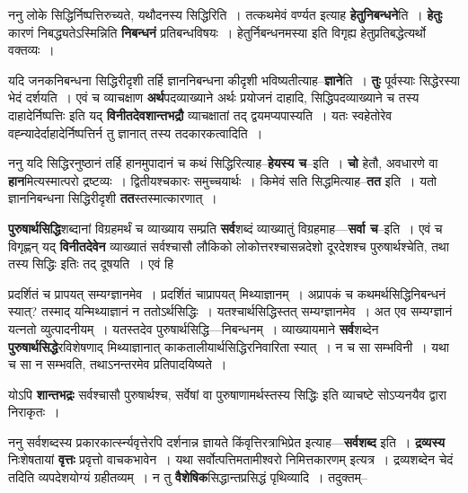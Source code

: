 \documentclass[article,12pt,a4paper]{memoir}
\begin{document}
	  \pstart ननु लोके सिद्धिर्निष्पत्तिरुच्यते, यथौदनस्य सिद्धिरिति । तत्कथमेवं वर्ण्यत इत्याह \textbf{हेतुनिबन्धने}ति । \textbf{हेतुः} कारणं निबद्ध्यतेऽस्मिन्निति \textbf{निबन्धनं} प्रतिबन्धविषयः । हेतुर्निबन्धनमस्या इति विगृह्य हेतुप्रतिबद्धेत्यर्थो वक्तव्यः ।
	\pend
      

	  \pstart यदि जनकनिबन्धना सिद्धिरीदृशी तर्हि ज्ञाननिबन्धना कीदृशी भविष्यतीत्याह--\textbf{ज्ञाने}ति । \textbf{तुः} पूर्वस्याः सिद्धेरस्या भेदं दर्शयति । एवं च व्याचक्षाण \textbf{अर्थ}पदव्याख्याने अर्थः प्रयोजनं दाहादि, सिद्धिपदव्याख्याने च तस्य दाहादेर्निष्पत्तिः इति यद् \textbf{विनीतदेवशान्तभद्रौ} व्याचक्षातां तद् द्वयमप्यपास्यति । यतः स्वहेतोरेव वह्न्यादेर्दाहादेर्निष्पत्तिर्न तु ज्ञानात् तस्य तदकारकत्वादिति ।
	\pend
      

	  \pstart ननु यदि सिद्धिरनुष्ठानं तर्हि हानमुपादानं च कथं सिद्धिरित्याह--\textbf{हेयस्य च}--इति । \textbf{चो} हेतौ, अवधारणे वा \textbf{हान}मित्यस्मात्परो द्रष्टव्यः । द्वितीयश्चकारः समुच्चयार्थः । किमेवं सति सिद्धमित्याह--\textbf{तत} इति । यतो ज्ञाननिबन्धना सिद्धिरीदृशी \textbf{तत}स्तस्मात्कारणात् ।
	\pend
      

	  \pstart \textbf{पुरुषार्थसिद्धि}शब्दानां विग्रहमर्थं च व्याख्याय सम्प्रति \textbf{सर्व}शब्दं व्याख्यातुं विग्रहमाह—\textbf{सर्वा च}--इति । एवं च विगृह्णन् यद् \textbf{विनीतदेवेन} व्याख्यातं सर्वश्चासौ लौकिको लोकोत्तरश्चासन्नदेशो दूरदेशश्च पुरुषार्थश्चेति, तथा तस्य सिद्धिः इतिः तद् दूषयति । एवं हि  \leavevmode{} 
	  
	प्रदर्शितं च प्रापयत् सम्यग्ज्ञानमेव । प्रदर्शितं चाप्रापयत् मिथ्याज्ञानम् । अप्रापकं च कथमर्थसिद्धिनिबन्धनं स्यात्? तस्माद् यन्मिथ्याज्ञानं न ततोऽर्थसिद्धिः । यतश्चार्थसिद्धिस्तत् सम्यग्ज्ञानमेव । अत एव सम्यग्ज्ञानं यत्नतो व्युत्पादनीयम् । यतस्तदेव पुरुषार्थसिद्धि—निबन्धनम् । व्याख्यायमाने \textbf{सर्व}शब्देन \textbf{पुरुषार्थसिद्धे}रविशेषणाद् मिथ्याज्ञानात् काकतालीयार्थसिद्धिरनिवारिता स्यात् । न च सा सम्भविनी । यथा च सा न सम्भवति, तथाऽनन्तरमेव प्रतिपादयिष्यते ।
	\pend
      

	  \pstart योऽपि \textbf{शान्तभद्रः} सर्वश्चासौ पुरुषार्थश्च, सर्वेषां वा पुरुषाणामर्थस्तस्य सिद्धिः इति व्याचष्टे सोऽप्यनयैव द्वारा निराकृतः ।
	\pend
      

	  \pstart ननु सर्वशब्दस्य प्रकारकार्त्स्न्यवृत्तेरपि दर्शनान्न ज्ञायते किंवृत्तिरत्राभिप्रेत इत्याह—\textbf{सर्वशब्द} इति । \textbf{द्रव्यस्य} निःशेषतायां \textbf{वृत्तः} प्रवृत्तो वाचकभावेन । यथा सर्वोत्पत्तिमतामीश्वरो निमित्तकारणम् इत्य\leavevmode{}त्र । द्रव्यशब्देन चेदं तदिति व्यपदेशयोग्यं ग्रहीतव्यम् । न तु \textbf{वैशेषिक}सिद्धान्तप्रसिद्धं पृथिव्यादि । तदुक्तम्--
	\pend
      
\end{document}
